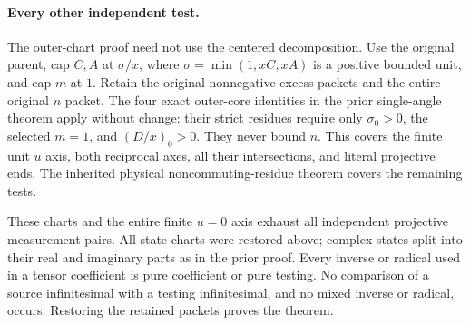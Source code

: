 \paragraph{Every other independent test.}
The outer-chart proof need not use the centered decomposition.
Use the original parent, cap $C,A$ at $\sigma/x$, where
$\sigma=\min(1,xC,xA)$ is a positive bounded unit, and cap $m$ at
$1$.  Retain the original nonnegative excess packets and the
entire original $n$ packet.  The four exact outer-core identities
in the prior single-angle theorem apply without change: their
strict residues require only $\sigma_0>0$, the selected $m=1$,
and $(D/x)_0>0$.  They never bound $n$.  This covers the finite
unit $u$ axis, both reciprocal axes, all their intersections, and
literal projective ends.  The inherited physical
noncommuting-residue theorem covers the remaining tests.

These charts and the entire finite $u=0$ axis exhaust all independent
projective measurement pairs.  All state charts were restored above;
complex states split into their real and imaginary parts as in the
prior proof.  Every inverse or radical used in a tensor coefficient
is pure coefficient or pure testing.  No comparison of a source
infinitesimal with a testing infinitesimal, and no mixed inverse
or radical, occurs.  Restoring the retained packets proves the theorem.
